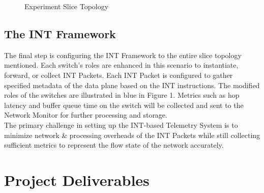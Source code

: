 \documentclass[conference]{IEEEtran}
\begin{document}
\begin{figure}
	\centering
	\caption{Experiment Slice Topology}
	\label{fig}
\end{figure} 

\subsection{The INT Framework}
The final step is configuring the INT Framework to the entire slice topology mentioned. Each switch's roles are enhanced in this scenario to instantiate, forward, or collect INT Packets. Each INT Packet is configured to gather specified metadata of the data plane based on the INT instructions. The modified roles of the switches are illustrated in blue in Figure 1. Metrics such as hop latency and buffer queue time on the switch will be collected and sent to the Network Monitor for further processing and storage. \\
The primary challenge in setting up the INT-based Telemetry System is to minimize network \& processing overheads of the INT Packets while still collecting sufficient metrics to represent the flow state of the network accurately.

\section{Project Deliverables}
\end{document}
